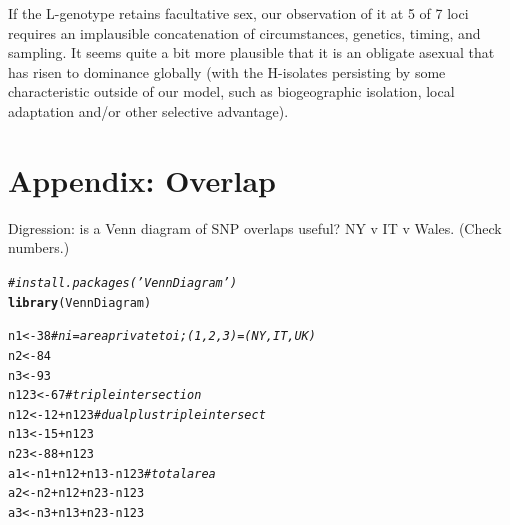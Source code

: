 \documentclass{article}\usepackage[]{graphicx}\usepackage[]{color}
\makeatletter
\newcommand{\hlnum}[1]{\textcolor[rgb]{0.686,0.059,0.569}{#1}}%
\newcommand{\hlcom}[1]{\textcolor[rgb]{0.678,0.584,0.686}{\textit{#1}}}%
\newcommand{\hlopt}[1]{\textcolor[rgb]{0,0,0}{#1}}%
\newcommand{\hlstd}[1]{\textcolor[rgb]{0.345,0.345,0.345}{#1}}%
\newcommand{\hlkwb}[1]{\textcolor[rgb]{0.69,0.353,0.396}{#1}}%
\newcommand{\hlkwd}[1]{\textcolor[rgb]{0.737,0.353,0.396}{\textbf{#1}}}%
\newenvironment{kframe}{%
 \def\at@end@of@kframe{}%
 \ifinner\ifhmode%
  \def\at@end@of@kframe{\end{minipage}}%
  \begin{minipage}{\columnwidth}%
 \fi\fi%
 \def\FrameCommand##1{\hskip\@totalleftmargin \hskip-\fboxsep
 \colorbox{shadecolor}{##1}\hskip-\fboxsep
     \hskip-\linewidth \hskip-\@totalleftmargin \hskip\columnwidth}%
 \MakeFramed {\advance\hsize-\width
   \@totalleftmargin\z@ \linewidth\hsize
   \@setminipage}}%
 {\par\unskip\endMakeFramed%
 \at@end@of@kframe}
\newenvironment{knitrout}{}{} %
\makeatother
\begin{document}
If the L-genotype retains facultative sex, our observation of it at 5 of 7 loci requires an
implausible concatenation of circumstances, genetics, timing, and sampling.  It seems quite a bit
more plausible that it is an obligate asexual that has risen to dominance globally (with the
H-isolates persisting by some characteristic outside of our model, such as biogeographic isolation,
local adaptation and/or other selective advantage).

\appendix

\section{Appendix: Overlap}

Digression: is a Venn diagram of SNP overlaps useful?  NY v IT v Wales.  (Check numbers.)

\begin{knitrout}\footnotesize
{}\color{fgcolor}\begin{kframe}
\begin{alltt}
\hlcom{#install.packages('VennDiagram')}
\hlkwd{library}\hlstd{(VennDiagram)}
\end{alltt}
\end{kframe}
\end{knitrout}

\begin{knitrout}\footnotesize
{}\color{fgcolor}\begin{kframe}
\begin{alltt}
\hlstd{n1}   \hlkwb{<-} \hlnum{38}        \hlcom{# ni = area private to i; (1,2,3)=(NY,IT,UK)}
\hlstd{n2}   \hlkwb{<-} \hlnum{84}
\hlstd{n3}   \hlkwb{<-} \hlnum{93}
\hlstd{n123} \hlkwb{<-} \hlnum{67}        \hlcom{# triple intersection}
\hlstd{n12}  \hlkwb{<-} \hlnum{12} \hlopt{+} \hlstd{n123} \hlcom{# dual plus triple intersect}
\hlstd{n13}  \hlkwb{<-} \hlnum{15} \hlopt{+} \hlstd{n123}
\hlstd{n23}  \hlkwb{<-} \hlnum{88} \hlopt{+} \hlstd{n123}
\hlstd{a1} \hlkwb{<-} \hlstd{n1} \hlopt{+} \hlstd{n12} \hlopt{+} \hlstd{n13} \hlopt{-} \hlstd{n123} \hlcom{# total area}
\hlstd{a2} \hlkwb{<-} \hlstd{n2} \hlopt{+} \hlstd{n12} \hlopt{+} \hlstd{n23} \hlopt{-} \hlstd{n123}
\hlstd{a3} \hlkwb{<-} \hlstd{n3} \hlopt{+} \hlstd{n13} \hlopt{+} \hlstd{n23} \hlopt{-} \hlstd{n123}
\end{alltt}
\end{kframe}
\end{knitrout}
\end{document}
